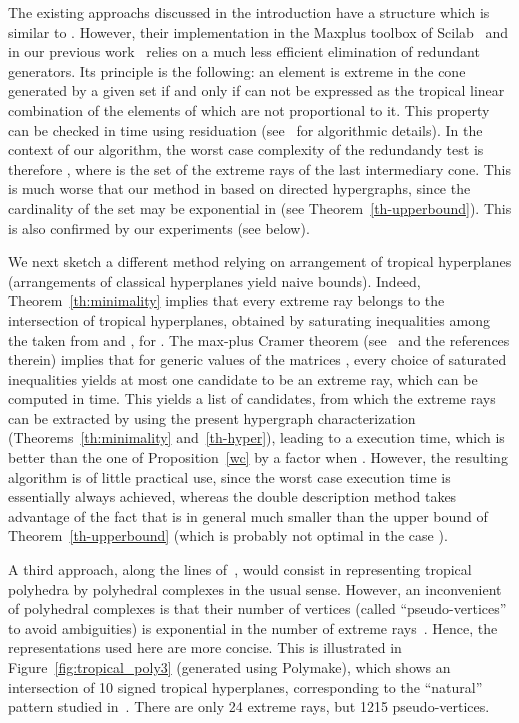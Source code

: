 \documentclass[proceedings]{stacs}
\begin{document}
The existing approachs discussed in the introduction have a structure which is similar to . However, their implementation in the Maxplus toolbox of {\sc Scilab}~\cite{toolbox} and in our previous work~\cite{AGG08} relies on a much less efficient elimination of redundant generators. Its principle is the following: an element  is extreme in the cone generated by a given set  if and only if  can not be expressed as the tropical linear combination of the elements of  which are not proportional to it. This property can be checked in  time using residuation (see~\cite{BSS} for algorithmic details). In the context of our algorithm, the worst case complexity of the redundandy test is therefore , where  is the set of the extreme rays of the last intermediary cone. This is much worse that our method in  based on directed hypergraphs, since the cardinality of the set  may be exponential in  (see Theorem~\ref{th-upperbound}). This is also confirmed by our experiments (see below).







We next sketch a different method relying on arrangement of tropical
hyperplanes (arrangements of classical hyperplanes
yield naive bounds). Indeed, Theorem~\ref{th:minimality}
implies that every extreme ray belongs to the intersection
of  tropical hyperplanes, 
obtained by saturating  inequalities among the  taken
from  and , for .
The max-plus Cramer theorem (see~\cite{AGG08b} and the references therein)
implies that for generic values of the matrices , every choice of 
saturated inequalities yields at most one candidate to be
an extreme ray, which can be computed
in  time. This yields a list of  candidates,
from which the extreme rays can be extracted by using the present hypergraph characterization (Theorems~\ref{th:minimality} and~\ref{th-hyper}), leading
to a  execution time, which is better than the one of Proposition~\ref{wc} by a factor  when .
However, the resulting algorithm is of little practical use, since 
the worst case execution time is essentially always achieved, whereas
the double description method takes advantage of the fact that 
is in general much smaller than the upper bound of Theorem~\ref{th-upperbound}
(which is probably not optimal in the case ).

A third approach, along the lines of~\cite{DS,joswig-2008}, would consist
in representing tropical polyhedra by polyhedral complexes in the usual sense.
However, an inconvenient of polyhedral complexes is that their number
of vertices (called ``pseudo-vertices'' to avoid ambiguities) is exponential
in the number of extreme rays~\cite{DS}. Hence, the representations used here
are more concise. 
This is illustrated in Figure~\ref{fig:tropical_poly3} (generated
using {\sc Polymake}), which shows an intersection of 10 signed tropical hyperplanes, corresponding
to the ``natural'' pattern studied in~\cite{AGK09}. There are only 24 extreme rays, but 1215 pseudo-vertices. 
\end{document}
